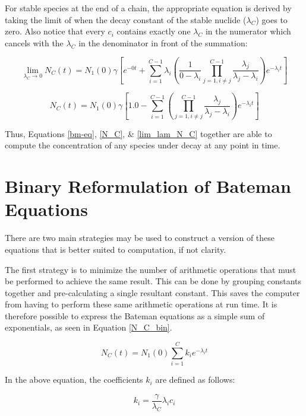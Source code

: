 \documentclass{anstrans}
\begin{document}
For stable species at the end of a chain, the appropriate equation is derived 
by taking the limit of when the decay constant of the stable nuclide 
($\lambda_C$) goes to zero.  Also notice that every $c_i$ contains exactly one $\lambda_C$
in the numerator which cancels with the $\lambda_C$ in the denominator 
in front of the summation:

\begin{equation}
\label{lim_lam}
\lim_{\lambda_C \to 0} N_C(t) = N_1(0)  \gamma \left[e^{-0t} + \sum_{i=1}^{C-1} \lambda_i \left(\frac{1}{0 - \lambda_i} \prod_{j=1,i\ne j}^{C-1} \frac{\lambda_j}{\lambda_j - \lambda_i} \right) e^{-\lambda_i t} \right]
\end{equation}

\begin{equation}
\label{lim_lam_N_C}
N_C(t) = N_1(0)  \gamma \left[1.0 - \sum_{i=1}^{C-1} \left(\prod_{j=1,i\ne j}^{C-1} \frac{\lambda_j}{\lambda_j - \lambda_i} \right) e^{-\lambda_i t} \right]
\end{equation}

Thus, Equations \ref{bm-eq}, \ref{N_C}, \& \ref{lim_lam_N_C} together are
able to compute the concentration of any species under decay 
at any point in time.

\section{Binary Reformulation of Bateman Equations}
\label{bin}
There are two main strategies may be used to construct a version of these 
equations that is better suited to computation, if not clarity. 

The first strategy is to minimize the number of arithmetic
operations that must be performed to achieve the same result. 
This can be done by grouping constants together and pre-calculating a single 
resultant constant. This saves the 
computer from having to perform these same arithmetic operations at run time.  
It is therefore possible to express the Bateman equations as a simple sum of 
exponentials, as seen in Equation \ref{N_C_bin}.

\begin{equation}
\label{N_C_bin}
N_C(t) = N_1(0) \sum_{i=1}^C k_{i} e^{-\lambda_i t}
\end{equation}

In the above equation, the coefficients $k_i$ are defined as follows:

\begin{equation}
\label{k_i}
k_i = \frac{\gamma}{\lambda_C} \lambda_i c_i
\end{equation}
\end{document}
